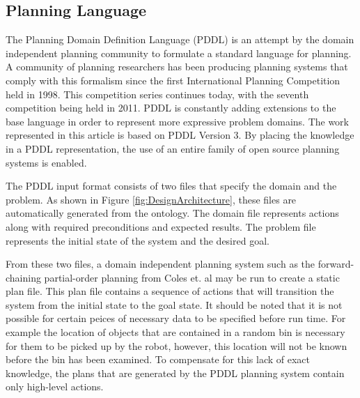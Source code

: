 \subsection{Planning Language}
The Planning Domain Definition Language (PDDL) \cite{PDDL} is an attempt by the
domain independent planning community to formulate a standard language
for planning. A community of planning researchers has been producing 
planning systems that comply with this formalism since the first International
Planning Competition held in 1998. This competition series continues today, 
with the seventh competition being held in 2011. PDDL is constantly
adding extensions to the base language in order to represent more expressive
problem domains. The work represented in this article is based on PDDL Version 3.
By placing the knowledge in a PDDL representation, the use of an
entire family of open source planning systems is enabled. 

The PDDL input format consists
of two files that specify the domain and the problem. As shown in Figure 
\ref{fig:DesignArchitecture}, these files are automatically
generated from the ontology. The domain file represents actions along
with required preconditions and expected results. The problem file
represents the initial state of the system and the desired goal. 

From these two files, a domain independent planning system such as
the forward-chaining partial-order planning from Coles et. al 
\cite{Coles.ICAPS.2010} may be run to create a static plan file. This
plan file contains a sequence of actions that will transition the
system from the initial state to the goal state. It should be noted that
it is not possible for certain peices of necessary data to be specified before
run time. For example the location of objects that are contained
in a random bin is necessary for them to be picked up by the robot,
however, this location will not be known before the bin has been examined.
To compensate for this lack of exact knowledge, the plans that are
generated by the PDDL planning system contain only high-level actions.

